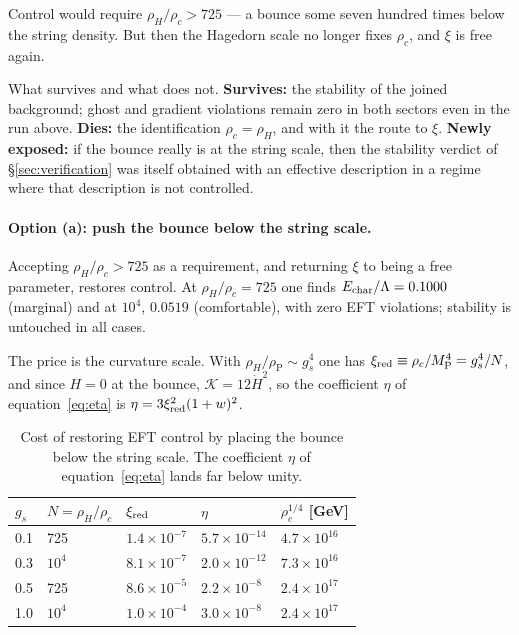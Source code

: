 \documentclass[a4paper,11pt]{article}
\begin{document}
Control would require $\rho_H/\rho_c>725$ --- a bounce some seven hundred times below the string density. But then the Hagedorn scale no longer fixes $\rho_c$, and $\xi$ is free again.

What survives and what does not. \textbf{Survives:} the stability of the joined background; ghost and gradient violations remain zero in both sectors even in the run above. \textbf{Dies:} the identification $\rho_c=\rho_H$, and with it the route to $\xi$. \textbf{Newly exposed:} if the bounce really is at the string scale, then the stability verdict of \S\ref{sec:verification} was itself obtained with an effective description in a regime where that description is not controlled.

\paragraph{Option (a): push the bounce below the string scale.}
Accepting $\rho_H/\rho_c>725$ as a requirement, and returning $\xi$ to being a free parameter, restores control. At $\rho_H/\rho_c=725$ one finds $E_{\rm char}/\Lambda=0.1000$ (marginal) and at $10^4$, $0.0519$ (comfortable), with zero EFT violations; stability is untouched in all cases.

The price is the curvature scale. With $\rho_H/\rho_\mathrm{P}\sim g_s^4$ one has $\xi_{\rm red}\equiv\rho_c/M_\mathrm{P}^4=g_s^4/N$, and since $H=0$ at the bounce, $\mathcal K=12\dot H^2$, so the coefficient $\eta$ of equation~\eqref{eq:eta} is $\eta=3\xi_{\rm red}^2(1+w)^2$.

\begin{table}[h]
\centering
\begin{tabular}{lllll}
\toprule
$g_s$ & $N=\rho_H/\rho_c$ & $\xi_{\rm red}$ & $\eta$ & $\rho_c^{1/4}$ [GeV] \\
\midrule
0.1 & 725      & $1.4\times10^{-7}$ & $5.7\times10^{-14}$ & $4.7\times10^{16}$ \\
0.3 & $10^{4}$ & $8.1\times10^{-7}$ & $2.0\times10^{-12}$ & $7.3\times10^{16}$ \\
0.5 & 725      & $8.6\times10^{-5}$ & $2.2\times10^{-8}$  & $2.4\times10^{17}$ \\
1.0 & $10^{4}$ & $1.0\times10^{-4}$ & $3.0\times10^{-8}$  & $2.4\times10^{17}$ \\
\bottomrule
\end{tabular}
\caption{Cost of restoring EFT control by placing the bounce below the string scale. The coefficient $\eta$ of equation~\eqref{eq:eta} lands far below unity.}
\label{tab:cost}
\end{table}
\end{document}
